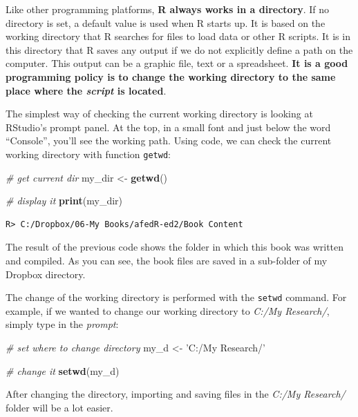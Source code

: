 \documentclass[
  12pt,
]{book}
\newenvironment{Shaded}{\begin{snugshade}}{\end{snugshade}}
\newcommand{\CommentTok}[1]{\textcolor[rgb]{0.37,0.37,0.37}{\textit{#1}}}
\newcommand{\KeywordTok}[1]{\textcolor[rgb]{0.27,0.27,0.27}{\textbf{#1}}}
\newcommand{\NormalTok}[1]{#1}
\newcommand{\StringTok}[1]{\textcolor[rgb]{0.5,0.5,0.5}{#1}}
\begin{document}
Like other programming platforms, \textbf{R always works in a directory}. If no directory is set, a default value is used when R starts up. It is based on the working directory that R searches for files to load data or other R scripts. It is in this directory that R saves any output if we do not explicitly define a path on the computer. This output can be a graphic file, text or a spreadsheet. \textbf{It is a good programming policy is to change the working directory to the same place where the \emph{script} is located}.

The simplest way of checking the current working directory is looking at RStudio's prompt panel. At the top, in a small font and just below the word ``Console'', you'll see the working path. Using code, we can check the current working directory with function \texttt{getwd}: 

\begin{Shaded}
\begin{Highlighting}[]
\CommentTok{# get current dir}
\NormalTok{my_dir <-}\StringTok{ }\KeywordTok{getwd}\NormalTok{()}

\CommentTok{# display it}
\KeywordTok{print}\NormalTok{(my_dir)}
\end{Highlighting}
\end{Shaded}

\begin{verbatim}
R> C:/Dropbox/06-My Books/afedR-ed2/Book Content
\end{verbatim}

The result of the previous code shows the folder in which this book was written and compiled. As you can see, the book files are saved in a sub-folder of my Dropbox directory.

The change of the working directory is performed with the \texttt{setwd} command. For example, if we wanted to change our working directory to \emph{C:/My Research/}, simply type in the \emph{prompt}: 

\begin{Shaded}
\begin{Highlighting}[]
\CommentTok{# set where to change directory}
\NormalTok{my_d <-}\StringTok{ 'C:/My Research/'}

\CommentTok{# change it}
\KeywordTok{setwd}\NormalTok{(my_d)}
\end{Highlighting}
\end{Shaded}

After changing the directory, importing and saving files in the \emph{C:/My Research/} folder will be a lot easier.
\end{document}
